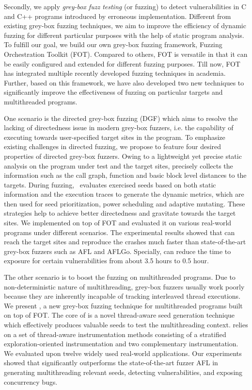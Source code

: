 Secondly, we apply \emph{grey-box fuzz testing} (or fuzzing) to detect vulnerabilities in C and C++ programs introduced by erroneous implementation. Different from existing grey-box fuzzing techniques, we aim to improve the efficiency of dynamic fuzzing for different particular purposes with the help of static program analysis. To fulfill our goal, we build our own grey-box fuzzing framework, Fuzzing Orchestration Toolkit (FOT). Compared to others, FOT is versatile in that it can be easily configured and extended for different fuzzing purposes. Till now, FOT has integrated multiple recently developed fuzzing techniques in academia. Further, based on this framework, we have also developed two new techniques to significantly improve the effectiveness of fuzzing on particular targets and multithreaded programs.

One scenario is the directed grey-box fuzzing (DGF) which aims to resolve the lacking of directedness issue in modern grey-box fuzzers, i.e. the capability of executing towards user-specified target sites in the program.
To emphasize existing challenges in \mbox{directed} fuzzing, we propose \dFOT to feature four desired properties of directed grey-box fuzzers.
Owing to a lightweight yet precise static analysis on the program under test and the target sites, \dFOT precisely collects the information such as the call graph, function and \mbox{basic} block level distances to the targets.
During fuzzing, \dFOT~{evaluates} exercised seeds based on both static information and the \mbox{execution} traces to generate the dynamic metrics, which are then used for seed prioritization, power scheduling and adaptive \mbox{mutating}.
These strategies help \dFOT to achieve better directedness and gravitate towards the target sites.
We implemented \dFOT on top of FOT and evaluated it on various real-world \mbox{programs} under different scenarios.
The experimental results showed that \dFOT can reach the target sites and reproduce the crashes much faster than state-of-the-art grey-box fuzzers such as AFL and AFLGo. Specially, \dFOT can reduce the time to exposure for certain vulnerabilities from about 3.5 hours to 0.5 hour. 

The other scenario is to boost the fuzzing on multithreaded programs. Due to non-deterministic nature of multithreading, grey-box fuzzers usually work poorly because they are inherently incapable of tracking interleaved thread executions. We present \mtfuzz, a new grey-box fuzzing technique for multithreaded programs built on top of FOT. The core of \mtfuzz is a novel thread-aware seed generation technique which effectively produces valuable seeds to test the multithreading context. \mtfuzz relies on a set of thread-aware instrumentation methods consisting of a stratified exploration-oriented instrumentation and two complementary instrumentation. We evaluated \mtfuzz upon twelve widely used real-world applications. Our experiments showed that \mtfuzz significantly outperforms the state-of-the-art fuzzer AFL in generating multithreading relevant seeds, detecting vulnerabilities, and exposing concurrency bugs.

